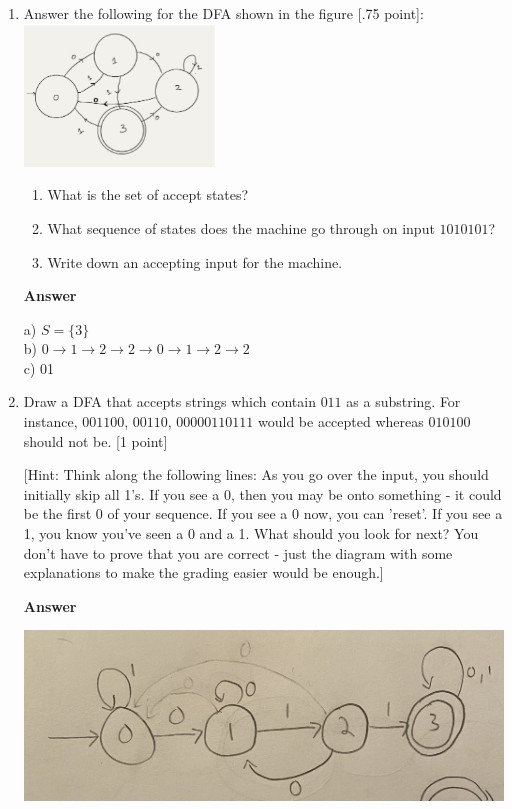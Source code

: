 \documentclass[11pt]{article}
\newcommand \kw[1]{\textbf{#1}}
\newenvironment{answer}{
\vspace{.5cm}
\kw{Answer} 

}
{
\pagebreak
}
\begin{document}
\begin{enumerate}
\begin{answer}
    \qed
\end{answer}

\item Answer the following for the DFA shown in the figure [.75 point]:\\
\includegraphics[width=2in]{DFA.png}

\begin{enumerate}
\item What is the set of accept states?
\item What sequence of states does the machine go through on input $1010101$?
\item Write down an accepting input for the machine.
\end{enumerate}

\begin{answer}
    a) $S = \{3\}$ \\ 
    b) $0 \rightarrow 1 \rightarrow 2 \rightarrow 2 \rightarrow 0 \rightarrow 1 \rightarrow 2 \rightarrow 2$ \\ 
    c) 01
\end{answer}

\item Draw a DFA that accepts strings which contain $011$ as a substring. For instance, $001100$, $00110$, $00000110111$ would be accepted whereas $010100$ should not be. [1 point]

[Hint: Think along the following lines: As you go over the input, you should initially skip all 1's. If you see a 0, then you may be onto something - it could be the first 0 of your sequence. If you see a 0 now, you can 'reset'. If you see a 1, you know you've seen a 0 and a 1. What should you look for next? You don't have to prove that you are correct - just the diagram with some explanations to make the grading easier would be enough.]

\begin{answer}
    \includegraphics[scale=.18]{dfa-3.jpg}


\end{answer}
\end{enumerate}
\end{document}
